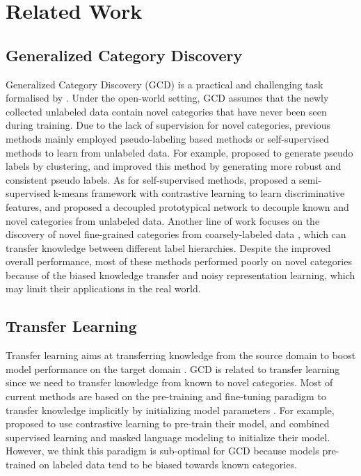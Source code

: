 \documentclass[letterpaper]{article} %
\begin{document}
\section{Related Work}
\subsection{Generalized Category Discovery}
Generalized Category Discovery (GCD) is a practical and challenging task formalised by \citet{gcd}. Under the open-world setting, GCD assumes that the newly collected unlabeled data contain novel categories that have never been seen during training. Due to the lack of supervision for novel categories, previous methods mainly employed pseudo-labeling based methods \citep{dtc,thu2020,mutual} or self-supervised methods \citep{ncl,simple,mtp} to learn from unlabeled data. For example, \citet{deepcluster} proposed to generate pseudo labels by clustering, \citet{thu2021} and \citet{ptjn} improved this method by generating more robust and consistent pseudo labels. As for self-supervised methods, \citet{gcd} proposed a semi-supervised k-means framework with contrastive learning to learn discriminative features, and \citet{dpn} proposed a decoupled prototypical network to decouple known and novel categories from unlabeled data.
Another line of work focuses on the discovery of novel fine-grained categories from coarsely-labeled data \citep{fcdc,dna,ner}, which can transfer knowledge between different label hierarchies.
Despite the improved overall performance, most of these methods performed poorly on novel categories because of the biased knowledge transfer and noisy representation learning, which may limit their applications in the real world.


\subsection{Transfer Learning}
Transfer learning aims at transferring knowledge from the source domain to boost model performance on the target domain \cite{transfer2,tail}. GCD is related to transfer learning since we need to transfer knowledge from known to novel categories. Most of current methods are based on the pre-training and fine-tuning paradigm to transfer knowledge implicitly by initializing model parameters \citep{thu2021}. For example, \citet{gcd} proposed to use contrastive learning to pre-train their model, and \citet{mtp} combined supervised learning and masked language modeling to initialize their model.
However, we think this paradigm is sub-optimal for GCD because models pre-trained on labeled data tend to be biased towards known categories.
\end{document}
